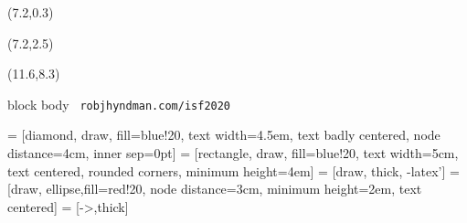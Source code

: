 
\usepackage{amsmath, bm, amssymb, amsthm, mathrsfs}
\usepackage[bb=boondox]{mathalfa}
\usepackage{url}
\usepackage{multirow, booktabs, float, textcmds, siunitx}
\usepackage{bm,booktabs,animate,ragged2e,multicol,microtype,hyperref}
\usepackage{tikz}

\graphicspath{{figs/}{tourism/}{energy/}}
\def\full#1{\vspace*{0.05cm}\centerline{\texttt{[image: \#1]}}}

\fontsize{13}{15}\sf
\usepackage[scale=0.85]{sourcecodepro}
\usepackage{fontawesome}

{
\begin{textblock}{10.5}(7.2,0.3)
\fontsize{26}{26}\sf\color[RGB]{204,89,0}\raggedright
\bfseries\inserttitle
\end{textblock}
\begin{textblock}{7.5}(7.2,2.5)
{\color[RGB]{130,92,68}\raggedright{\insertauthor}\quad\insertdate}
\end{textblock}
\begin{textblock}{4.2}(11.6,8.3)
\begin{beamercolorbox}[wd=4.3cm,ht=0.35cm,dp=0.2cm]{block body}
\fontsize{10}{10}\sf\color[RGB]{72,45,34}~\texttt{robjhyndman.com/isf2020}
\end{beamercolorbox}
\end{textblock}}



\usetikzlibrary{trees,shapes,arrows,matrix}
 = [diamond, draw, fill=blue!20,
    text width=4.5em, text badly centered, node distance=4cm, inner sep=0pt]
 = [rectangle, draw, fill=blue!20,
    text width=5cm, text centered, rounded corners, minimum height=4em]
 = [draw, thick, -latex']
 = [draw, ellipse,fill=red!20, node distance=3cm,
    minimum height=2em, text centered]
 = [->,thick]


\def\E{\text{E}}
\def\V{\text{Var}}
\def\bY{\bm{y}}
\def\by{\bm{y}}
\def\bS{\bm{S}}
\def\bG{\bm{G}}
\def\bSigma{\bm{\Sigma}}
\def\Var{\text{Var}}
\def\var{\text{Var}}
\newcommand{\btwocol}{\begin{multicols}{2}}
\newcommand{\etwocol}{\end{multicols}}


